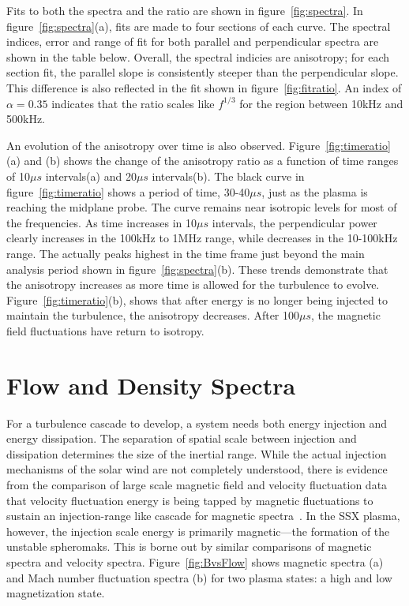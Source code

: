 \documentclass[aip,prl,amsmath,amssymb,reprint,superscriptaddress]{revtex4-1} %
\begin{document}
Fits to both the spectra and the ratio are shown in figure~\ref{fig:spectra}. In figure~\ref{fig:spectra}(a), fits are made to four sections of each curve. The spectral indices, error and range of fit for both parallel and perpendicular spectra are shown in the table below. Overall, the spectral indicies are anisotropy; for each section fit, the parallel slope is consistently steeper than the perpendicular slope. This difference is also reflected in the fit shown in figure~\ref{fig:fitratio}. An index of $\alpha = 0.35$ indicates that the ratio scales like $f^{1/3}$ for the region between 10kHz and 500kHz.

An evolution of the anisotropy over time is also observed. Figure~\ref{fig:timeratio}(a) and (b) shows the change of the anisotropy ratio as a function of time ranges of 10$\mu s$ intervals(a) and 20$\mu s$ intervals(b). The black curve in figure~\ref{fig:timeratio} shows a period of time, 30-40$\mu s$, just as the plasma is reaching the midplane probe. The curve remains near isotropic levels for most of the frequencies. As time increases in 10$\mu s$ intervals, the perpendicular power clearly increases in the 100kHz to 1MHz range, while decreases in the 10-100kHz range. The actually peaks highest in the time frame just beyond the main analysis period shown in figure~\ref{fig:spectra}(b). These trends demonstrate that the anisotropy increases as more time is allowed for the turbulence to evolve. Figure~\ref{fig:timeratio}(b), shows that after energy is no longer being injected to maintain the turbulence, the anisotropy decreases. After 100$\mu s$, the magnetic field fluctuations have return to isotropy.

\section{Flow and Density Spectra}

For a turbulence cascade to develop, a system needs both energy injection and energy dissipation. The separation of spatial scale between injection and dissipation determines the size of the inertial range. While the actual injection mechanisms of the solar wind are not completely understood, there is evidence from the comparison of large scale magnetic field and velocity fluctuation data that velocity fluctuation energy is being tapped by magnetic fluctuations to sustain an injection-range like cascade for magnetic spectra~\cite{roberts10}. In the SSX plasma, however, the injection scale energy is primarily magnetic---the formation of the unstable spheromaks. This is borne out by similar comparisons of magnetic spectra and velocity spectra. Figure~\ref{fig:BvsFlow} shows magnetic spectra (a) and Mach number fluctuation spectra (b) for two plasma states: a high and low magnetization state.
\end{document}

